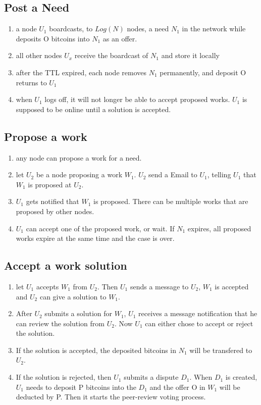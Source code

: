 \documentclass[12pt]{article}
\begin{document}
\subsection{Post a Need}
\begin{enumerate}
	\item a node $U_1$ boardcasts, to $Log(N)$ nodes, a need $N_1$ in the network while deposits O bitcoins into $N_1$ as an offer.
	\item all other nodes $U_x$ receive the boardcast of $N_1$ and store it locally
	\item after the TTL expired, each node removes $N_1$ permanently, and deposit O returns to $U_1$
	\item when $U_1$ logs off, it will not longer be able to accept proposed works. $U_1$ is supposed to be online until a solution is accepted.  
\end{enumerate}

\subsection{Propose a work}
\begin{enumerate}
	\item any node can propose a work for a need.
	\item let $U_2$ be a node proposing a work $W_1$. $U_2$ send a Email to $U_1$, telling $U_1$ that $W_1$ is proposed at $U_2$.
	\item $U_1$ gets notified that $W_1$ is proposed. There can be multiple works that are proposed by other nodes. 
	\item $U_1$ can accept one of the proposed work, or wait. If $N_1$ expires, all proposed works expire at the same time and the case is over.
\end{enumerate}

\subsection{Accept a work solution}
\begin{enumerate}
	\item let $U_1$ accepts $W_1$ from $U_2$. Then $U_1$ sends a message to $U_2$, $W_1$ is accepted and $U_2$ can give a solution to $W_1$.
	\item After $U_2$ submits a solution for $W_1$, $U_1$ receives a message notification that he can review the solution from $U_2$. Now $U_1$ can either chose to accept or reject the solution.
	\item If the solution is accepted, the deposited bitcoins in $N_1$ will be transfered to $U_2$.
	\item If the solution is rejected, then $U_1$ submits a dispute $D_1$. When $D_1$ is created, $U_1$ needs to deposit P bitcoins into the $D_1$ and the offer O in $W_1$ will be deducted by P. Then it starts the peer-review voting process.
\end{enumerate}
\end{document}

